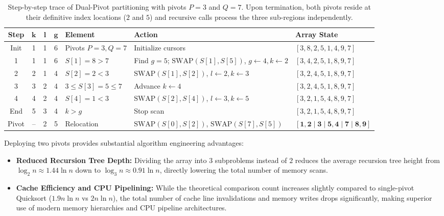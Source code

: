 \begin{table}[H]
  \centering
  \small
  \begin{tabularx}{\textwidth}{c c c c >{\centering\arraybackslash}p{2.6cm} >{\raggedright\arraybackslash}X >{\centering\arraybackslash}p{3.2cm}}
    \toprule
    \textbf{Step} & $\boldsymbol{k}$ & $\boldsymbol{l}$ & $\boldsymbol{g}$ & \textbf{Element} & \textbf{Action} & \textbf{Array State} \\
    \midrule
    Init & 1 & 1 & 6 & Pivots $P=3, Q=7$ & Initialize cursors & $[3, 8, 2, 5, 1, 4, 9, 7]$ \\
    1 & 1 & 1 & 6 & $S[1]=8 > 7$ & Find $g=5$; $\text{SWAP}(S[1], S[5])$, $g \leftarrow 4, k \leftarrow 2$ & $[3, 4, 2, 5, 1, 8, 9, 7]$ \\
    2 & 2 & 1 & 4 & $S[2]=2 < 3$ & $\text{SWAP}(S[1], S[2])$, $l \leftarrow 2, k \leftarrow 3$ & $[3, 2, 4, 5, 1, 8, 9, 7]$ \\
    3 & 3 & 2 & 4 & $3 \le S[3]=5 \le 7$ & Advance $k \leftarrow 4$ & $[3, 2, 4, 5, 1, 8, 9, 7]$ \\
    4 & 4 & 2 & 4 & $S[4]=1 < 3$ & $\text{SWAP}(S[2], S[4])$, $l \leftarrow 3, k \leftarrow 5$ & $[3, 2, 1, 5, 4, 8, 9, 7]$ \\
    \midrule
    End & 5 & 3 & 4 & $k > g$ & Stop scan & $[3, 2, 1, 5, 4, 8, 9, 7]$ \\
    Pivot & -- & 2 & 5 & Relocation & $\text{SWAP}(S[0], S[2])$, $\text{SWAP}(S[7], S[5])$ & $\mathbf{[1, 2 \mid 3 \mid 5, 4 \mid 7 \mid 8, 9]}$ \\
    \bottomrule
  \end{tabularx}
  \caption{Step-by-step trace of Dual-Pivot partitioning with pivots $P = 3$ and $Q = 7$. Upon termination, both pivots reside at their definitive index locations ($2$ and $5$) and recursive calls process the three sub-regions independently.}
  \label{tab:dual-pivot-execution-trace}
\end{table}

\FloatBarrier

\begin{property}
Deploying two pivots provides substantial algorithm engineering advantages:
\begin{itemize}
  \item \textbf{Reduced Recursion Tree Depth:} Dividing the array into $3$ subproblems instead of $2$ reduces the average recursion tree height from $\log_2 n \approx 1.44 \ln n$ down to $\log_3 n \approx 0.91 \ln n$, directly lowering the total number of memory scans.
  \item \textbf{Cache Efficiency and CPU Pipelining:} While the theoretical comparison count increases slightly compared to single-pivot Quicksort ($1.9 n \ln n$ vs $2 n \ln n$), the total number of cache line invalidations and memory writes drops significantly, making superior use of modern memory hierarchies and CPU pipeline architectures.
\end{itemize}
\end{property}

